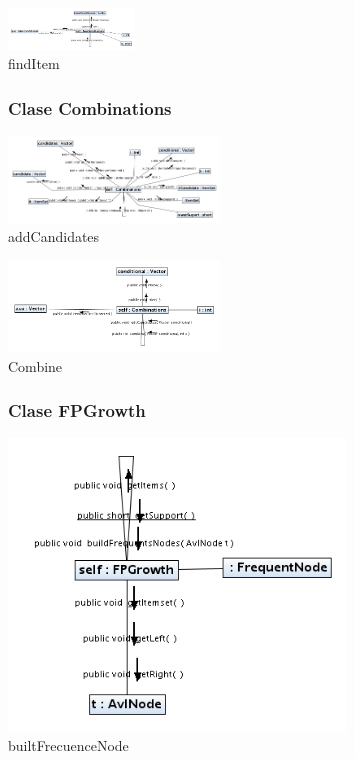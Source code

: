 \newpage
\begin{figure}
\centering
\includegraphics[angle=90,width=0.3\textwidth]{imgsColaboracion/FPGrowth/BaseConditionals/findItem.png}
\caption{findItem}
\end{figure}
\newpage
\begin{figure}
\subsubsection{Clase Combinations}
\centering
\includegraphics[angle=90,width=0.5\textwidth]{imgsColaboracion/FPGrowth/Combinations/addCandidates.png}
\caption{addCandidates}
\end{figure}
\newpage
\begin{figure}
\centering
\includegraphics[angle=90,width=0.5\textwidth]{imgsColaboracion/FPGrowth/Combinations/Combine.png}
\caption{Combine}
\end{figure}
\newpage
\begin{figure}
\subsubsection{Clase FPGrowth}
\centering
\includegraphics[width=0.8\textwidth]{imgsColaboracion/FPGrowth/FPGrowth/builtFrecuenceNode.png}
\caption{builtFrecuenceNode}
\end{figure}
